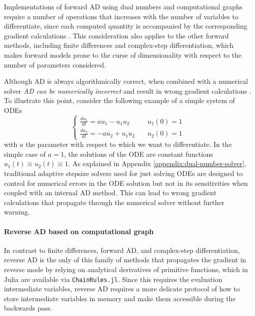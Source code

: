 Implementations of forward AD using dual numbers and computational graphs require a number of operations that increases with the number of variables to differentiate, since each computed quantity is accompanied by the corresponding gradient calculations \cite{Griewank_1989}. 
This consideration also applies to the other forward methods, including finite differences and complex-step differentiation, which makes forward models prone to the curse of dimensionality with respect to the number of parameters considered.

Although AD is always algorithmically correct, when combined with a numerical solver \textit{AD can be numerically incorrect} and result in wrong gradient calculations \cite{Eberhard_Bischof_1996}. 
To illustrate this point, consider the following example of a simple system of ODEs
\begin{equation}
\begin{cases}
 \frac{du_1}{dt} = a u_1 - u_1 u_2 & \quad u_1(0) = 1  \\ 
 \frac{du_2}{dt} = - a u_2 + u_1 u_2 & \quad u_2(0) = 1
\end{cases}
\end{equation}
with $a$ the parameter with respect to which we want to differentiate. 
In the simple case of $a=1$, the solutions of the ODE are constant functions $u_1(t) \equiv u_2(t) \equiv 1$. 
As explained in Appendix \ref{appendix:dual-number-solver}, traditional adaptive stepsize solvers used for just solving ODEs are designed to control for numerical errors in the ODE solution but not in its sensitivities when coupled with an internal AD method. 
This can lead to wrong gradient calculations that propagate through the numerical solver without further warning. 


\paragraph{Reverse AD based on computational graph}
\label{sec:software-reverse-AD}

In contrast to finite differences, forward AD, and complex-step differentiation, reverse AD is the only of this family of methods that propagates the gradient in reverse mode by relying on analytical derivatives of primitive functions, which in Julia are available via \texttt{ChainRules.jl}.
Since this requires the evaluation intermediate variables, reverse AD requires a more delicate protocol of how to store intermediate variables in memory and make them accessible during the backwards pass. 

